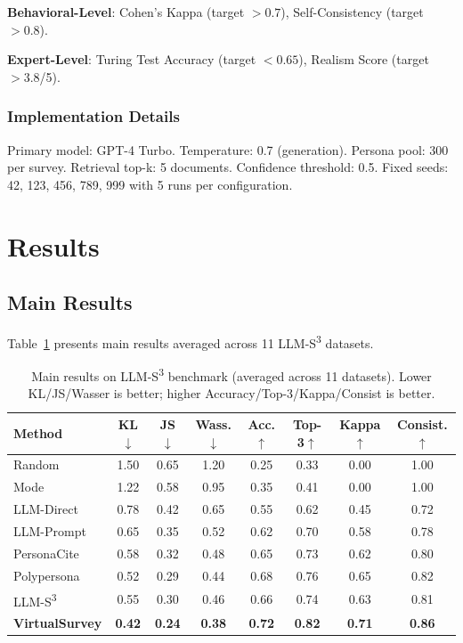 \documentclass[sigconf,nonarchival]{acmart}
\begin{document}
\textbf{Behavioral-Level}: Cohen's Kappa (target $> 0.7$), Self-Consistency (target $> 0.8$).

\textbf{Expert-Level}: Turing Test Accuracy (target $< 0.65$), Realism Score (target $> 3.8$/5).

\subsubsection{Implementation Details}

Primary model: GPT-4 Turbo. Temperature: 0.7 (generation). Persona pool: 300 per survey. Retrieval top-k: 5 documents. Confidence threshold: 0.5. Fixed seeds: 42, 123, 456, 789, 999 with 5 runs per configuration.


\section{Results}

\subsection{Main Results}

Table~\ref{tab:main} presents main results averaged across 11 LLM-S\textsuperscript{3} datasets.

\begin{table}[t]
\centering
\caption{Main results on LLM-S\textsuperscript{3} benchmark (averaged across 11 datasets). Lower KL/JS/Wasser is better; higher Accuracy/Top-3/Kappa/Consist is better.}
\label{tab:main}
\small
\begin{tabular}{l|ccccccc}
\toprule
Method & KL$\downarrow$ & JS$\downarrow$ & Wass.$\downarrow$ & Acc.$\uparrow$ & Top-3$\uparrow$ & Kappa$\uparrow$ & Consist.$\uparrow$ \\
\midrule
Random & 1.50 & 0.65 & 1.20 & 0.25 & 0.33 & 0.00 & 1.00 \\
Mode & 1.22 & 0.58 & 0.95 & 0.35 & 0.41 & 0.00 & 1.00 \\
LLM-Direct & 0.78 & 0.42 & 0.65 & 0.55 & 0.62 & 0.45 & 0.72 \\
LLM-Prompt & 0.65 & 0.35 & 0.52 & 0.62 & 0.70 & 0.58 & 0.78 \\
PersonaCite & 0.58 & 0.32 & 0.48 & 0.65 & 0.73 & 0.62 & 0.80 \\
Polypersona & 0.52 & 0.29 & 0.44 & 0.68 & 0.76 & 0.65 & 0.82 \\
LLM-S\textsuperscript{3} & 0.55 & 0.30 & 0.46 & 0.66 & 0.74 & 0.63 & 0.81 \\
\midrule
\textbf{VirtualSurvey} & \textbf{0.42} & \textbf{0.24} & \textbf{0.38} & \textbf{0.72} & \textbf{0.82} & \textbf{0.71} & \textbf{0.86} \\
\bottomrule
\end{tabular}
\end{table}
\end{document}
